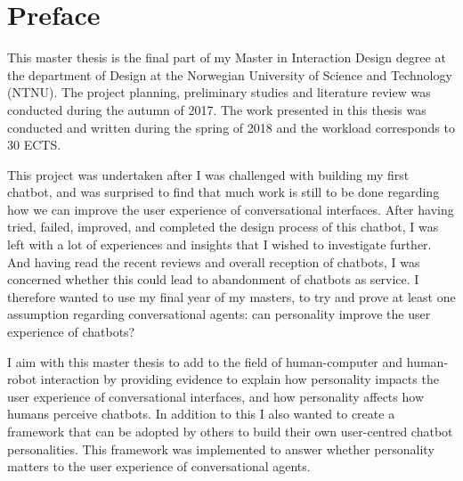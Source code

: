 \hypersetup{pageanchor=false}
%

\chapter*{Preface}
This master thesis is the final part of my Master in Interaction Design degree at the department of Design at the Norwegian University of Science and Technology (NTNU). The project planning, preliminary studies and literature review was conducted during the autumn of 2017. The work presented in this thesis was conducted and written during the spring of 2018 and the workload corresponds to 30 ECTS.

This project was undertaken after I was challenged with building my first chatbot, and was surprised to find that much work is still to be done regarding how we can improve the user experience of conversational interfaces. After having tried, failed, improved, and completed the design process of this chatbot, I was left with a lot of experiences and insights that I wished to investigate further. And having read the recent reviews and overall reception of chatbots, I was concerned whether this could lead to abandonment of chatbots as service. I therefore wanted to use my final year of my masters, to try and prove at least one assumption regarding conversational agents: can personality improve the user experience of chatbots?

I aim with this master thesis to add to the field of human-computer and human-robot interaction by providing evidence to explain how personality impacts the user experience of conversational interfaces, and how personality affects how humans perceive chatbots. In addition to this I also wanted to create a framework that can be adopted by others to build their own user-centred chatbot personalities. This framework was implemented to answer whether personality matters to the user experience of conversational agents.

\vspace{5mm}

\thesisdate \\[1pc]
\\[1pc]
